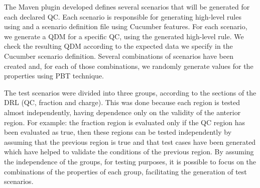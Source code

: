 
The Maven plugin developed defines several scenarios that will be generated for each declared QC. Each scenario is responsible for generating high-level rules using \hlrdsl and a scenario definition file using Cucumber features. For each scenario, we generate a QDM for a specific QC, using the generated high-level rule.
We check the resulting QDM according to the expected data we specify in the Cucumber scenario definition. Several combinations of scenarios have been created and, for each of those combinations, we randomly generate values for the properties using PBT technique.


The test scenarios were divided into three groups, according to the sections of the DRL (QC, fraction and charge). This was done because each region is tested almost independently, having dependence only on the validity of the anterior region. For example: the fraction region is evaluated only if the QC region has been evaluated as true, then these regions can be tested independently by assuming that the previous region is true and that test cases have been generated which have helped to validate the conditions of the previous region. By assuming the independence of the groups, for testing purposes, it is possible to focus on the combinations of the properties of each group, facilitating the generation of test scenarios.

